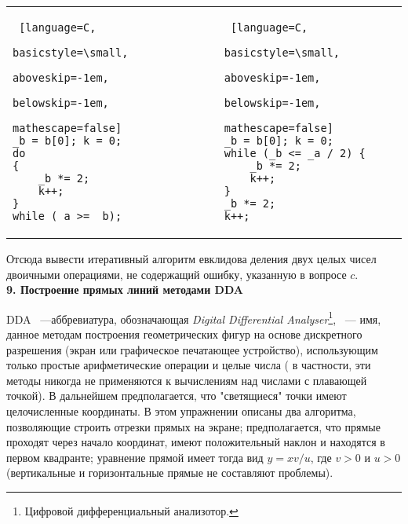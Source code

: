 \pagebreak
	
\iffalse
\noindent 
\begin{minipage}[t]{50mm}\parindent=2em
 
 
\fbox{$b\leftarrow{b_{0}}$;$k\leftarrow{0}$;\linebreak
While(1) \{\linebreak
$b\leftarrow{2\times{b}}$;$ k\leftarrow{k+1}$;\linebreak
  If(b>a) \{\linebreak
       Break;\}\}}\linebreak
\end{minipage} 
\hfill 
\begin{minipage}[t]{50mm} 
\fbox{$b\leftarrow{b_{0}}$;$k\leftarrow{0}$;\linebreak
While(b<=a/2) \{\linebreak
      While(1)\{\linebreak
$b\leftarrow{2\times{b}}$;$ k\leftarrow{k+1}$;\}\}\linebreak
$b\leftarrow{2\times{b}}$;$ k\leftarrow{k+1}$;}\linebreak
\end{minipage}
\fi


\begin{tabular}{p{6cm} p{6cm}}
\centering
\begin{lstlisting} [language=C,
					basicstyle=\small,
					aboveskip=-1em,
					belowskip=-1em,
					mathescape=false]			
_b = b[0]; k = 0;
do 
{
	_b *= 2;
	k++;
}
while (_a >= _b);
\end{lstlisting}&
\begin{lstlisting} [language=C,
					basicstyle=\small,
					aboveskip=-1em,
					belowskip=-1em,
					mathescape=false]
_b = b[0]; k = 0;
while (_b <= _a / 2) {
	_b *= 2;
	k++;
}
_b *= 2;
k++;
\end{lstlisting}
\end{tabular}

Отсюда вывести итеративный алгоритм евклидова деления двух целых чисел двоичными операциями, не содержащий ошибку, указанную в вопросе $c$. \newline
\\

\noindent\textbf { 9. Построение прямых линий методами DDA}\ \newline

DDA ~---аббревиатура, обозначающая \textit{Digital Differential Analyser}\footnote[1]{Цифровой дифференциальный анализотор.}, ~--- имя, данное методам построения геометрических фигур на основе дискретного разрешения (экран или графическое печатающее устройство), использующим только простые арифметические операции и целые числа ( в частности, эти методы никогда не применяются к вычислениям над числами с плавающей точкой). В дальнейшем предполагается, что "светящиеся" точки имеют целочисленные координаты. 
В этом упражнении описаны два алгоритма, позволяющие строить отрезки прямых на экране; предполагается, что прямые проходят через начало координат, имеют положительный наклон и находятся в первом квадранте; уравнение прямой имеет тогда вид $y=xv/u$, где $v>0$ и $u>0$ (вертикальные и горизонтальные прямые не составляют проблемы). 

